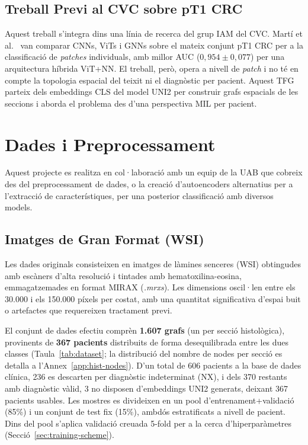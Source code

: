 \documentclass[10pt,a4paper,twocolumn,twoside]{article}
\begin{document}
\subsection{Treball Previ al CVC sobre pT1 CRC}

Aquest treball s'integra dins una línia de recerca del grup IAM del CVC. Martí et
al.~\cite{ddd.uab.cat:317556} van comparar CNNs, ViTs i GNNs sobre el mateix conjunt
pT1 CRC per a la classificació de \textit{patches} individuals, amb millor AUC
($0{,}954 \pm 0{,}077$) per una arquitectura híbrida ViT+NN. El treball, però,
opera a nivell de \textit{patch} i no té en compte la topologia espacial del teixit
ni el diagnòstic per pacient. Aquest TFG parteix dels embeddings CLS del model UNI2
per construir grafs espacials de les seccions i aborda el problema des d'una
perspectiva MIL per pacient.

\section{Dades i Preprocessament}

Aquest projecte es realitza en col·laboració amb un equip de la UAB que cobreix des del preprocessament de dades, o
la creació d'autoencoders alternatius per a l'extracció de característiques, per una posterior classificació amb
diversos models.

\subsection{Imatges de Gran Format (WSI)}

Les dades originals consisteixen en imatges de làmines senceres (WSI) obtingudes amb escàners d'alta resolució i
tintades amb hematoxilina-eosina, emmagatzemades en format MIRAX (\textit{.mrxs}). Les dimensions oscil·len entre
els 30.000 i els 150.000 píxels per costat, amb una quantitat significativa d'espai buit o artefactes que
requereixen tractament previ.

El conjunt de dades efectiu comprèn \textbf{1.607 grafs} (un per secció histològica), provinents de
\textbf{367 pacients} distribuits de forma desequilibrada entre les dues classes
(Taula~\ref{tab:dataset}; la distribució del nombre de nodes per secció es detalla a
l'Annex~\ref{app:hist-nodes}). D'un total de 606 pacients a la base de dades clínica, 236 es descarten
per diagnòstic indeterminat (NX), i dels 370 restants amb diagnòstic vàlid, 3 no disposen
d'embeddings UNI2 generats, deixant 367 pacients usables. Les mostres es divideixen en un pool d'entrenament+validació (85\%) i un
conjunt de test fix (15\%), ambdós estratificats a nivell de pacient. Dins del pool s'aplica
validació creuada 5-fold per a la cerca d'hiperparàmetres (Secció~\ref{sec:training-scheme}).
\end{document}
